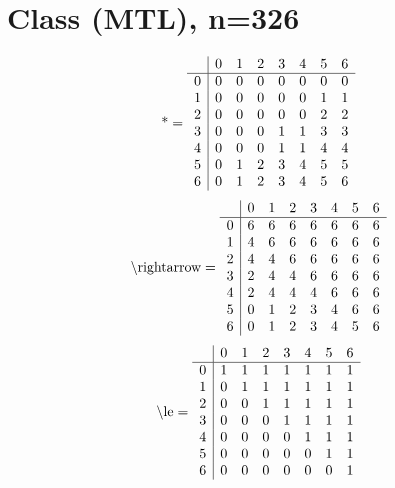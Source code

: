 \documentclass[11pt]{article}
\begin{document}
\section{Class (MTL), n=326}
\[\text{*} = 
\begin{array}{r | r r r r r r r}
 & 0 & 1 & 2 & 3 & 4 & 5 & 6 \\ \hline
0 & 0 & 0 & 0 & 0 & 0 & 0 & 0 \\
1 & 0 & 0 & 0 & 0 & 0 & 1 & 1 \\
2 & 0 & 0 & 0 & 0 & 0 & 2 & 2 \\
3 & 0 & 0 & 0 & 1 & 1 & 3 & 3 \\
4 & 0 & 0 & 0 & 1 & 1 & 4 & 4 \\
5 & 0 & 1 & 2 & 3 & 4 & 5 & 5 \\
6 & 0 & 1 & 2 & 3 & 4 & 5 & 6 \\
\end{array}
\]
\[\text{\textbackslash rightarrow} = 
\begin{array}{r | r r r r r r r}
 & 0 & 1 & 2 & 3 & 4 & 5 & 6 \\ \hline
0 & 6 & 6 & 6 & 6 & 6 & 6 & 6 \\
1 & 4 & 6 & 6 & 6 & 6 & 6 & 6 \\
2 & 4 & 4 & 6 & 6 & 6 & 6 & 6 \\
3 & 2 & 4 & 4 & 6 & 6 & 6 & 6 \\
4 & 2 & 4 & 4 & 4 & 6 & 6 & 6 \\
5 & 0 & 1 & 2 & 3 & 4 & 6 & 6 \\
6 & 0 & 1 & 2 & 3 & 4 & 5 & 6 \\
\end{array}
\]
\[\text{\textbackslash le} = 
\begin{array}{r | r r r r r r r}
 & 0 & 1 & 2 & 3 & 4 & 5 & 6 \\ \hline
0 & 1 & 1 & 1 & 1 & 1 & 1 & 1 \\
1 & 0 & 1 & 1 & 1 & 1 & 1 & 1 \\
2 & 0 & 0 & 1 & 1 & 1 & 1 & 1 \\
3 & 0 & 0 & 0 & 1 & 1 & 1 & 1 \\
4 & 0 & 0 & 0 & 0 & 1 & 1 & 1 \\
5 & 0 & 0 & 0 & 0 & 0 & 1 & 1 \\
6 & 0 & 0 & 0 & 0 & 0 & 0 & 1 \\
\end{array}
\]
\end{document}
